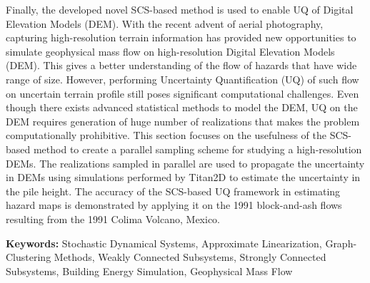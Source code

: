 Finally, the developed novel SCS-based method is used to enable UQ of Digital Elevation Models (DEM). With the recent advent of aerial photography, capturing high-resolution terrain information has provided new opportunities to simulate geophysical mass flow on high-resolution Digital Elevation Models (DEM). 
This gives a better understanding of the flow of hazards that have wide range of size. However, performing Uncertainty Quantification (UQ) of such flow on uncertain terrain profile still poses significant computational challenges. 
Even though there exists advanced statistical methods to model the DEM, UQ on the DEM requires generation of huge number of realizations that makes the problem computationally prohibitive. 
This section focuses on the usefulness of the SCS-based method to create a parallel sampling scheme for studying a high-resolution DEMs. 
The realizations sampled in parallel are used to propagate the uncertainty in DEMs using simulations performed by Titan2D to estimate the uncertainty in the pile height.
The accuracy of the SCS-based UQ framework in estimating hazard maps is demonstrated by applying it on the 1991 block-and-ash flows resulting from the 1991 Colima Volcano, Mexico. 

\textbf{Keywords: }Stochastic Dynamical Systems, Approximate Linearization, Graph-Clustering Methods, Weakly Connected Subsystems, Strongly Connected Subsystems, Building Energy Simulation, Geophysical Mass Flow

